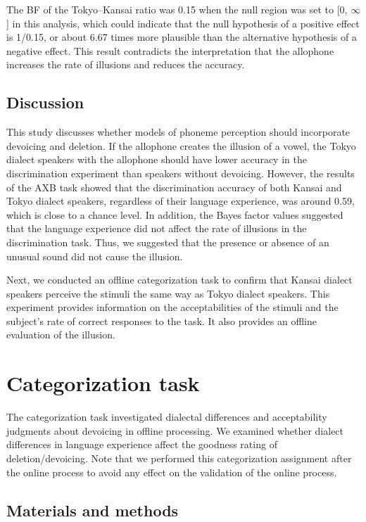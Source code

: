 \documentclass[a4paper,11pt,twocolumn]{article}
\begin{document}
The BF of the Tokyo--Kansai ratio was 0.15 when the null region was set to [0, $\infty$] in this analysis, which could indicate that the null hypothesis of a positive effect is 1/0.15, or about 6.67 times more plausible than the alternative hypothesis of a negative effect. This result contradicts the interpretation that the allophone increases the rate of illusions and reduces the accuracy.

\subsection{Discussion}

This study discusses whether models of phoneme perception should incorporate devoicing and deletion. If the allophone creates the illusion of a vowel, the Tokyo dialect speakers with the allophone should have lower accuracy in the discrimination experiment than speakers without devoicing. However, the results of the AXB task showed that the discrimination accuracy of both Kansai and Tokyo dialect speakers, regardless of their language experience, was around 0.59, which is close to a chance level. In addition, the Bayes factor values suggested that the language experience did not affect the rate of illusions in the discrimination task. Thus, we suggested that the presence or absence of an unusual sound did not cause the illusion.

Next, we conducted an offline categorization task to confirm that Kansai dialect speakers perceive the stimuli the same way as Tokyo dialect speakers. This experiment provides information on the acceptabilities of the stimuli and the subject's rate of correct responses to the task. It also provides an offline evaluation of the illusion.


\section{Categorization task}

The categorization task investigated dialectal differences and acceptability judgments about devoicing in offline processing. We examined whether dialect differences in language experience affect the goodness rating of deletion/devoicing. Note that we performed this categorization assignment after the online process to avoid any effect on the validation of the online process.

\subsection{Materials and methods}
\end{document}
